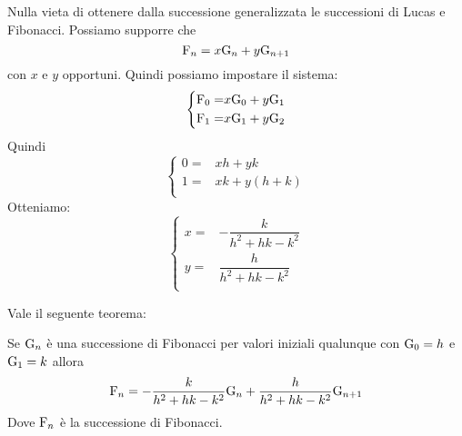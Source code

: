 Nulla vieta di ottenere dalla successione generalizzata le successioni di Lucas 
e Fibonacci.
Possiamo supporre che \begin{equation*}
	\mathrm{F}_{n}=x\mathrm{G}_{n}+y\mathrm{G}_{n+1}
\end{equation*}
con $x$ e $y$ opportuni. Quindi possiamo impostare il sistema:
\begin{equation*}
	\left\{
	\begin{aligned}
		\mathrm{F}_{0}=&x\mathrm{G}_{0}+y\mathrm{G}_{1}\\
		\mathrm{F}_{1}=&x\mathrm{G}_{1}+y\mathrm{G}_{2}\\
	\end{aligned}
	\right.
\end{equation*}
Quindi
\begin{equation*}
	\left\{
	\begin{aligned}
	0=&xh+yk\\
	1=&xk+y(h+k)\\
	\end{aligned}
	\right.
\end{equation*}
Otteniamo:
\begin{equation*}
	\left\{
	\begin{aligned}
		x=&-\dfrac{k}{h^2+hk-k^2}\\
	y=&\dfrac{h}{h^2+hk-k^2}\\
	\end{aligned}
	\right.
\end{equation*}

Vale il seguente teorema:
\begin{thm}
	Se $\mathrm{G}_{n}$ è una successione di Fibonacci per valori iniziali qualunque  
	con $\mathrm{G}_{0}=h$ 
	e $\mathrm{G}_{1}=k $ allora
	\begin{equation}
		\mathrm{F}_{n}=-\dfrac{k}{h^2+hk-k^2}\mathrm{G}_{n}+\dfrac{h}{h^2+hk-k^2}\mathrm{G}_{n+1}
	\end{equation}\label{thm:GenDerFib}
	Dove $\mathrm{F}_{n}$ è la successione di Fibonacci.
\end{thm}~\cite{Rabinowitz_1996}


